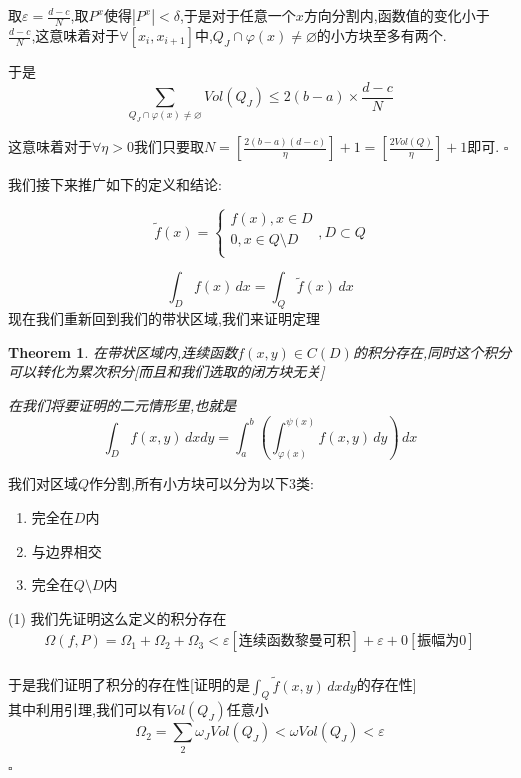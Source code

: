 \documentclass[11pt,hyperref,a4paper,UTF8]{ctexart}
\newtheorem{theorem}{Theorem}[subsection]
\newenvironment{cproof}{%
\heiti{证明}\kaishu
}{%
  \hfill $\square$
  \par\bigskip
}
\newcommand{\parameter}[1]{\left(#1\right)}
\newcommand{\bracket}[1]{\left[#1\right]}
\begin{document}
\begin{CJK}{UTF8}{gkai}
\begin{cproof}
  取$\varepsilon = \frac{d - c}{N}$,取$P^x$使得$|P^x| < \delta$,于是对于任意一个$x$方向分割内,函数值的变化小于$\frac{d - c}{N}$,这意味着对于$\forall [x_i,x_{i + 1}]$中,$Q_J \cap \varphi(x) \neq \varnothing$的小方块至多有两个.

  于是
  \[\sum_{Q_J \cap \varphi(x) \neq \varnothing} Vol(Q_J) \leq 2(b - a) \times \frac{d - c}{N}\]

  这意味着对于$\forall \eta > 0$我们只要取$N = \bracket{\frac{2(b - a)(d - c)}{\eta}} + 1 = \bracket{\frac{2Vol(Q)}{\eta}} + 1$即可.
\end{cproof}

我们接下来推广如下的定义和结论:

\[\tilde{f}(x) = \begin{cases}
  f(x), x \in D\\
  0 ,x \in Q \setminus D\\
\end{cases}, D \subset Q\]

\[\int_{D} f(x)\, dx = \int_{Q} \tilde{f}(x)\, dx\]
现在我们重新回到我们的带状区域,我们来证明定理

\begin{theorem}
  在带状区域内,连续函数$f(x,y) \in C(D)$的积分存在,同时这个积分可以转化为累次积分[而且和我们选取的闭方块无关]

  在我们将要证明的二元情形里,也就是
  \[\int_{D} f(x,y)\, dxdy = \int_{a}^{b} \parameter{\int_{\varphi(x)}^{\psi(x)}f(x,y)\, dy}\, dx\]
\end{theorem}

\begin{cproof}
  我们对区域$Q$作分割,所有小方块可以分为以下$3$类:
  \begin{enumerate}
    \item 完全在$D$内
    \item 与边界相交
    \item 完全在$Q\setminus D$内
  \end{enumerate}

  (1) 我们先证明这么定义的积分存在
  \[
  \begin{aligned}
    \Omega(f,P) = \Omega_1 + \Omega_2 + \Omega_3 < \varepsilon[\text{连续函数黎曼可积}] + \varepsilon + 0[\text{振幅为}0]\\
  \end{aligned}  
  \]

  于是我们证明了积分的存在性[证明的是$\int_{Q} \tilde{f}(x,y)\, dx dy$的存在性]\\

  其中利用引理,我们可以有$Vol(Q_J)$任意小
  \[\Omega_2 = \sum_{2} \omega_J Vol(Q_J) < \omega Vol(Q_J) < \varepsilon\]


\end{cproof}
\end{CJK}
\end{document}
